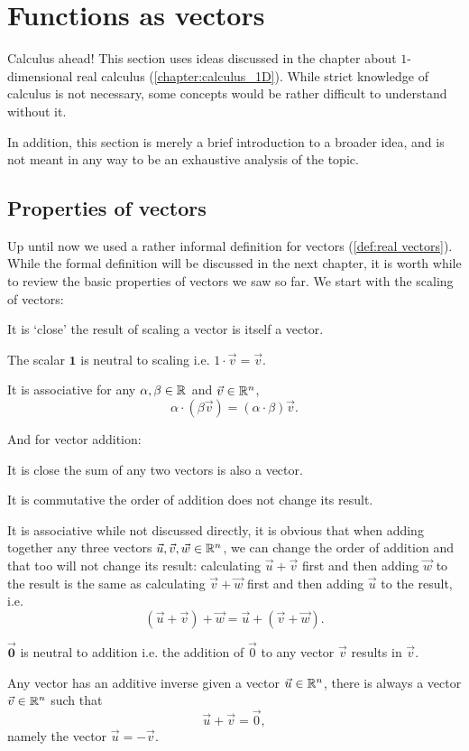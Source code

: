 \section{Functions as vectors}
\begin{note}{Calculus ahead!}{}
	This section uses ideas discussed in the chapter about $1$-dimensional real calculus (\autoref{chapter:calculus_1D}). While strict knowledge of calculus is not necessary, some concepts would be rather difficult to understand without it.
	
	In addition, this section is merely a brief introduction to a broader idea, and is not meant in any way to be an exhaustive analysis of the topic.
\end{note}

\subsection{Properties of vectors}
Up until now we used a rather informal definition for vectors (\autoref{def:real vectors}). While the formal definition will be discussed in the next chapter, it is worth while to review the basic properties of vectors we saw so far. We start with the scaling of vectors:
\begin{descitemize}
	\item[It is `close'] the result of scaling a vector is itself a vector.
	\item[The scalar $\bm{1}$ is neutral to scaling] i.e. $1\cdot\vec{v}=\vec{v}$.
	\item[It is associative] for any $\alpha,\beta\in\Rs$ and $\vec{v}\in\Rs[n]$,
		\[
			\alpha\cdot \left( \beta\vec{v} \right) = \left( \alpha\cdot\beta \right)\vec{v}.
		\]
\end{descitemize}

And for vector addition:
\begin{descitemize}
	\item[It is close] the sum of any two vectors is also a vector.
	\item[It is commutative] the order of addition does not change its result.
	\item[It is associative] while not discussed directly, it is obvious that when adding together any three vectors $\vec{u},\vec{v},\vec{w}\in \Rs[n]$, we can change the order of addition and that too will not change its result: calculating $\vec{u}+\vec{v}$ first and then adding $\vec{w}$ to the result is the same as calculating $\vec{v}+\vec{w}$ first and then adding $\vec{u}$ to the result, i.e.
		\[
			\left( \vec{u}+\vec{v} \right) + \vec{w} = \vec{u} + \left( \vec{v}+\vec{w} \right).
		\]
	\item[$\bm{\vec{0}}$ is neutral to addition] i.e. the addition of $\vec{0}$ to any vector $\vec{v}$ results in $\vec{v}$.
	\item[Any vector has an additive inverse] given a vector $\vec{u}\in\Rs[n]$, there is always a vector $\vec{v}\in\Rs[n]$ such that
		\[
			\vec{u}+\vec{v}=\vec{0},
		\]
		namely the vector $\vec{u}=-\vec{v}$.
\end{descitemize}


